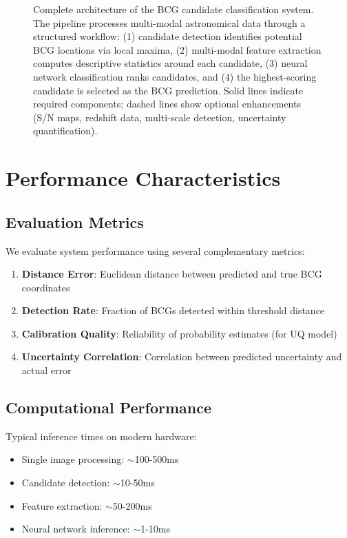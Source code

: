 \documentclass[twocolumn,10pt]{aastex631}
\begin{document}
\begin{figure*}[t]
\begin{tikzpicture}
\end{tikzpicture}
\caption{Complete architecture of the BCG candidate classification system. The pipeline processes multi-modal astronomical data through a structured workflow: (1) candidate detection identifies potential BCG locations via local maxima, (2) multi-modal feature extraction computes descriptive statistics around each candidate, (3) neural network classification ranks candidates, and (4) the highest-scoring candidate is selected as the BCG prediction. Solid lines indicate required components; dashed lines show optional enhancements (S/N maps, redshift data, multi-scale detection, uncertainty quantification).}
\label{fig:architecture}
\end{figure*}

\section{Performance Characteristics}

\subsection{Evaluation Metrics}
We evaluate system performance using several complementary metrics:

\begin{enumerate}
\item \textbf{Distance Error}: Euclidean distance between predicted and true BCG coordinates
\item \textbf{Detection Rate}: Fraction of BCGs detected within threshold distance
\item \textbf{Calibration Quality}: Reliability of probability estimates (for UQ model)
\item \textbf{Uncertainty Correlation}: Correlation between predicted uncertainty and actual error
\end{enumerate}

\subsection{Computational Performance}
Typical inference times on modern hardware:
\begin{itemize}
\item Single image processing: $\sim$100-500ms
\item Candidate detection: $\sim$10-50ms
\item Feature extraction: $\sim$50-200ms  
\item Neural network inference: $\sim$1-10ms
\end{itemize}
\end{document}
